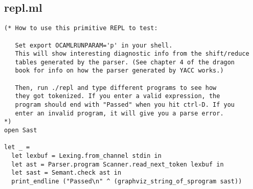 \documentclass{article}
\begin{document}
\subsection{repl.ml}
\begin{verbatim}
(* How to use this primitive REPL to test:

   Set export OCAMLRUNPARAM='p' in your shell.
   This will show interesting diagnostic info from the shift/reduce
   tables generated by the parser. (See chapter 4 of the dragon
   book for info on how the parser generated by YACC works.)

   Then, run ./repl and type different programs to see how
   they got tokenized. If you enter a valid expression, the
   program should end with "Passed" when you hit ctrl-D. If you
   enter an invalid program, it will give you a parse error.
*)
open Sast

let _ =
  let lexbuf = Lexing.from_channel stdin in
  let ast = Parser.program Scanner.read_next_token lexbuf in
  let sast = Semant.check ast in
  print_endline ("Passed\n" ^ (graphviz_string_of_sprogram sast))
\end{verbatim}
\end{document}
